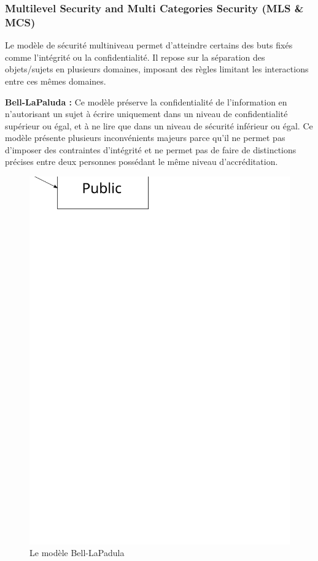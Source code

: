 \documentclass[pdftex,a4paper,titlepage,11pt]{article}
\begin{document}
\subsubsection{Multilevel Security and Multi Categories Security (MLS \& MCS)}

Le modèle de sécurité multiniveau permet d'atteindre certains des buts fixés comme l'intégrité ou la confidentialité. Il repose sur la séparation des objets/sujets en plusieurs domaines, imposant des règles limitant les interactions entre ces mêmes domaines.

\textbf{Bell-LaPaluda :} Ce modèle préserve la confidentialité de l'information en n'autorisant un sujet à écrire uniquement dans un niveau de confidentialité supérieur ou égal, et à ne lire que dans un niveau de sécurité inférieur ou égal. Ce modèle présente plusieurs inconvénients majeurs parce qu'il ne permet pas d'imposer des contraintes d'intégrité et ne permet pas de faire de distinctions précises entre deux personnes possédant le même niveau d'accréditation.

\begin{figure}[h]
	\centering
	\includegraphics[scale=0.5]{bell-lp}
	\caption{Le modèle Bell-LaPadula}
\end{figure}
\end{document}
